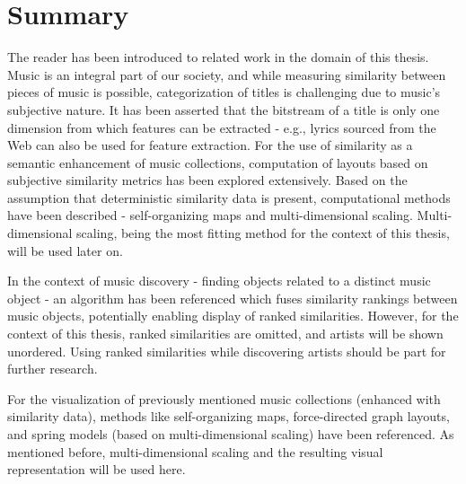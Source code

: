 \section{Summary}

The reader has been introduced to related work in the domain of this thesis. Music is an integral part of our society, and while measuring similarity between pieces of music is possible, categorization of titles is challenging due to music's subjective nature. It has been asserted that the bitstream of a title is only one dimension from which features can be extracted - e.g., lyrics sourced from the Web can also be used for feature extraction. For the use of similarity as a semantic enhancement of music collections, computation of layouts based on subjective similarity metrics has been explored extensively. Based on the assumption that deterministic similarity data is present, computational methods have been described - self-organizing maps and multi-dimensional scaling. Multi-dimensional scaling, being the most fitting method for the context of this thesis, will be used later on.

In the context of music discovery - finding objects related to a distinct music object - an algorithm has been referenced which fuses similarity rankings between music objects, potentially enabling display of ranked similarities. However, for the context of this thesis, ranked similarities are omitted, and artists will be shown unordered. Using ranked similarities while discovering artists should be part for further research.

For the visualization of previously mentioned music collections (enhanced with similarity data), methods like self-organizing maps, force-directed graph layouts, and spring models (based on multi-dimensional scaling) have been referenced. As mentioned before, multi-dimensional scaling and the resulting visual representation will be used here.